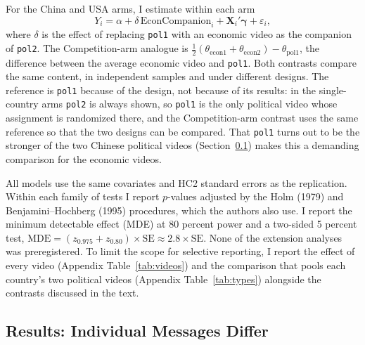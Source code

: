 \documentclass[11pt]{article}
\newcommand{\vid}[1]{\texttt{#1}}
\begin{document}
For the China and USA arms, I estimate within each arm
\begin{equation}
Y_i = \alpha + \delta\,\text{EconCompanion}_i + \mathbf{X}_i'\boldsymbol{\gamma} + \varepsilon_i,
\label{eq:companion}
\end{equation}
where $\delta$ is the effect of replacing \vid{pol1} with an economic video as the companion of \vid{pol2}. The Competition-arm analogue is $\tfrac{1}{2}(\theta_{\text{econ1}} + \theta_{\text{econ2}}) - \theta_{\text{pol1}}$, the difference between the average economic video and \vid{pol1}. Both contrasts compare the same content, in independent samples and under different designs. The reference is \vid{pol1} because of the design, not because of its results: in the single-country arms \vid{pol2} is always shown, so \vid{pol1} is the only political video whose assignment is randomized there, and the Competition-arm contrast uses the same reference so that the two designs can be compared. That \vid{pol1} turns out to be the stronger of the two Chinese political videos (Section~\ref{sec:messages}) makes this a demanding comparison for the economic videos.

All models use the same covariates and HC2 standard errors as the replication. Within each family of tests I report $p$-values adjusted by the Holm (1979) and Benjamini--Hochberg (1995) procedures, which the authors also use. I report the minimum detectable effect (MDE) at 80 percent power and a two-sided 5 percent test, $\text{MDE} = (z_{0.975} + z_{0.80}) \times \text{SE} \approx 2.8 \times \text{SE}$. None of the extension analyses was preregistered. To limit the scope for selective reporting, I report the effect of every video (Appendix Table~\ref{tab:videos}) and the comparison that pools each country's two political videos (Appendix Table~\ref{tab:types}) alongside the contrasts discussed in the text.

\subsection{Results: Individual Messages Differ}
\label{sec:messages}
\end{document}
